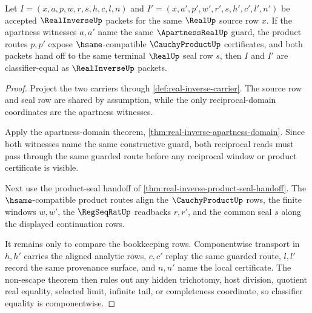 \begin{theorem}
\label{thm:real-inverse-guarded-product-uniqueness}
Let $I=(x,a,p,w,r,s,h,c,l,n)$ and $I'=(x,a',p',w',r',s,h',c',l',n')$ be accepted $\RealInverseUp$ packets for the same $\RealUp$ source row $x$. If the apartness witnesses $a,a'$ name the same $\ApartnessRealUp$ guard, the product routes $p,p'$ expose $\hsame$-compatible $\CauchyProductUp$ certificates, and both packets hand off to the same terminal $\RealUp$ seal row $s$, then $I$ and $I'$ are classifier-equal as $\RealInverseUp$ packets.
\end{theorem}
\begin{proof}
Project the two carriers through \autoref{def:real-inverse-carrier}. The source row and seal row are shared by assumption, while the only reciprocal-domain coordinates are the apartness witnesses.

Apply the apartness-domain theorem, \autoref{thm:real-inverse-apartness-domain}. Since both witnesses name the same constructive guard, both reciprocal reads must pass through the same guarded route before any reciprocal window or product certificate is visible.

Next use the product-seal handoff of \autoref{thm:real-inverse-product-seal-handoff}. The $\hsame$-compatible product routes align the $\CauchyProductUp$ rows, the finite windows $w,w'$, the $\RegSeqRatUp$ readbacks $r,r'$, and the common seal $s$ along the displayed continuation rows.

It remains only to compare the bookkeeping rows. Componentwise transport in $h,h'$ carries the aligned analytic rows, $c,c'$ replay the same guarded route, $l,l'$ record the same provenance surface, and $n,n'$ name the local certificate. The non-escape theorem then rules out any hidden trichotomy, host division, quotient real equality, selected limit, infinite tail, or completeness coordinate, so classifier equality is componentwise.
\end{proof}

